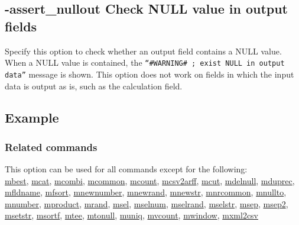 

%

\subsection{-assert\_nullout Check NULL value in output fields\label{sect:option_assert_nullout}}

Specify this option to check whether an output field contains a NULL value. When a NULL value is contained, the \verb|“#WARNING# ; exist NULL in output data”| message is shown. This option does not work on fields in which the input data is output as is, such as the calculation field.

\subsection*{Example}


\subsubsection*{Related commands}
This option can be used for all commands except for the following: \\
\hyperref[sect:mbest]{mbest},
\hyperref[sect:mcat]{mcat},
\hyperref[sect:mcombi]{mcombi},
\hyperref[sect:mcommon]{mcommon},
\hyperref[sect:mcount]{mcount},
\hyperref[sect:mcsv2arff]{mcsv2arff},
\hyperref[sect:mcut]{mcut},
\hyperref[sect:mdelnull]{mdelnull},
\hyperref[sect:mduprec]{mduprec},
\hyperref[sect:mfldname]{mfldname},
\hyperref[sect:mfsort]{mfsort},
\hyperref[sect:mnewnumber]{mnewnumber},
\hyperref[sect:mnewrand]{mnewrand},
\hyperref[sect:mnewstr]{mnewstr},
\hyperref[sect:mnrcommon]{mnrcommon},
\hyperref[sect:mnullto]{mnullto},
\hyperref[sect:mnumber]{mnumber},
\hyperref[sect:mproduct]{mproduct},
\hyperref[sect:mrand]{mrand},
\hyperref[sect:msel]{msel},
\hyperref[sect:mselnum]{mselnum},
\hyperref[sect:mselrand]{mselrand},
\hyperref[sect:mselstr]{mselstr},
\hyperref[sect:msep]{msep},
\hyperref[sect:msep2]{msep2},
\hyperref[sect:msetstr]{msetstr},
\hyperref[sect:msortf]{msortf},
\hyperref[sect:mtee]{mtee},
\hyperref[sect:mtonull]{mtonull},
\hyperref[sect:muniq]{muniq},
\hyperref[sect:mvcount]{mvcount},
\hyperref[sect:mwindow]{mwindow},
\hyperref[sect:mxml2csv]{mxml2csv}\\

%

